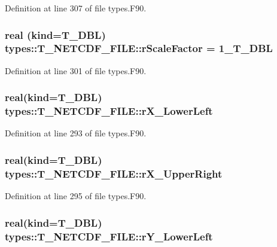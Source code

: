 Definition at line 307 of file types.F90.

\hypertarget{typetypes_1_1_t___n_e_t_c_d_f___f_i_l_e_a9c744d504c0b7bcf63ea841a461e6c3d}{
\subsubsection[{rScaleFactor}]{\setlength{\rightskip}{0pt plus 5cm}real (kind={\bf T\_\-DBL}) {\bf types::T\_\-NETCDF\_\-FILE::rScaleFactor} = 1\_\-T\_\-DBL}}
\label{typetypes_1_1_t___n_e_t_c_d_f___f_i_l_e_a9c744d504c0b7bcf63ea841a461e6c3d}


Definition at line 301 of file types.F90.

\hypertarget{typetypes_1_1_t___n_e_t_c_d_f___f_i_l_e_a49a3482796722ec751e300efd9cbd641}{
\subsubsection[{rX\_\-LowerLeft}]{\setlength{\rightskip}{0pt plus 5cm}real(kind={\bf T\_\-DBL}) {\bf types::T\_\-NETCDF\_\-FILE::rX\_\-LowerLeft}}}
\label{typetypes_1_1_t___n_e_t_c_d_f___f_i_l_e_a49a3482796722ec751e300efd9cbd641}


Definition at line 293 of file types.F90.

\hypertarget{typetypes_1_1_t___n_e_t_c_d_f___f_i_l_e_a39a27d9d3b76e663b97c00ee39d11201}{
\subsubsection[{rX\_\-UpperRight}]{\setlength{\rightskip}{0pt plus 5cm}real(kind={\bf T\_\-DBL}) {\bf types::T\_\-NETCDF\_\-FILE::rX\_\-UpperRight}}}
\label{typetypes_1_1_t___n_e_t_c_d_f___f_i_l_e_a39a27d9d3b76e663b97c00ee39d11201}


Definition at line 295 of file types.F90.

\hypertarget{typetypes_1_1_t___n_e_t_c_d_f___f_i_l_e_a903cdcdcee724fffd02cf168f4270cea}{
\subsubsection[{rY\_\-LowerLeft}]{\setlength{\rightskip}{0pt plus 5cm}real(kind={\bf T\_\-DBL}) {\bf types::T\_\-NETCDF\_\-FILE::rY\_\-LowerLeft}}}
\label{typetypes_1_1_t___n_e_t_c_d_f___f_i_l_e_a903cdcdcee724fffd02cf168f4270cea}



